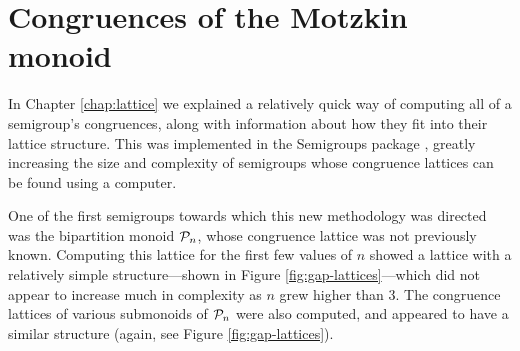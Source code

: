 \chapter{Congruences of the Motzkin monoid}
\label{chap:motzkin}

In Chapter \ref{chap:lattice} we explained a relatively quick way of computing
all of a semigroup's congruences, along with information about how they fit into
their lattice structure.  This was implemented in the Semigroups package
\cite{semigroups}, greatly increasing the size and complexity of semigroups
whose congruence lattices can be found using a computer.

One of the first semigroups towards which this new methodology was directed was
the bipartition monoid $\mathcal{P}_n$, whose congruence lattice was not previously
known.  Computing this lattice for the first few values of $n$ showed a lattice
with a relatively simple structure---shown in Figure
\ref{fig:gap-lattices}---which did not appear to increase much in complexity as
$n$ grew higher than $3$.  The congruence lattices of various submonoids of
$\mathcal{P}_n$ were also computed, and appeared to have a similar structure (again,
see Figure \ref{fig:gap-lattices}).

